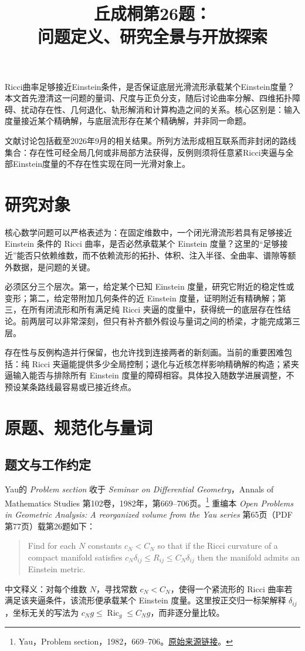 \documentclass[11pt,a4paper]{article}
\title{丘成桐第26题：\\问题定义、研究全景与开放探索}
\author{}\date{}
\theoremstyle{definition}
\newcommand{\Ric}{\operatorname{Ric}}
\newcommand{\src}[3]{\footnote{\raggedright #1，#2。\href{#3}{原始来源链接}。}}
\begin{document}
\maketitle
\vspace{-2em}

Ricci曲率足够接近Einstein条件，是否保证底层光滑流形承载某个Einstein度量？本文首先澄清这一问题的量词、尺度与正负分支，随后讨论曲率分解、四维拓扑障碍、扰动存在性、几何退化、轨形解消和计算构造之间的关系。核心区别是：输入度量接近某个精确解，与底层流形存在某个精确解，并非同一命题。

文献讨论包括截至2026年9月的相关结果。所列方法形成相互联系而非封闭的路线集合：存在性可经全局几何或非局部方法获得，反例则须将任意紧Ricci夹逼与全部Einstein度量的不存在性实现在同一光滑对象上。

\tableofcontents
\newpage

\section{研究对象}

核心数学问题可以严格表述为：在固定维数中，一个闭光滑流形若具有足够接近 Einstein 条件的 Ricci 曲率，是否必然承载某个 Einstein 度量？这里的“足够接近”能否只依赖维数，而不依赖流形的拓扑、体积、注入半径、全曲率、谱隙等额外数据，是问题的关键。

必须区分三个层次。第一，给定某个已知 Einstein 度量，研究它附近的稳定性或变形；第二，给定带附加几何条件的近 Einstein 度量，证明附近有精确解；第三，在所有闭流形和所有满足纯 Ricci 夹逼的度量中，获得统一的底层存在性结论。前两层可以非常深刻，但只有补齐额外假设与量词之间的桥梁，才能完成第三层。

存在性与反例构造并行保留，也允许找到连接两者的新刻画。当前的重要困难包括：纯 Ricci 夹逼能提供多少全局控制；退化与近核怎样影响精确解的构造；紧夹逼输入能否与排除所有 Einstein 度量的障碍相容。具体投入随数学进展调整，不预设某条路线最容易或已接近终点。

\section{原题、规范化与量词}\label{sec:definition}

\subsection{题文与工作约定}

Yau的 \emph{Problem section} 收于 \emph{Seminar on Differential Geometry}，Annals of Mathematics Studies 第102卷，1982年，第669--706页。\src{Yau}{Problem section，1982，669--706}{https://doi.org/10.1515/9781400881918-035}
重编本 \emph{Open Problems in Geometric Analysis: A reorganized volume from the Yau series} 第65页（PDF第77页）载第26题如下：
\begin{quote}
Find for each $N$ constants $c_N<C_N$ so that if the Ricci curvature of a compact manifold satisfies $c_N\delta_{ij}\le R_{ij}\le C_N\delta_{ij}$ then the manifold admits an Einstein metric.
\end{quote}
中文释义：对每个维数 $N$，寻找常数 $c_N<C_N$，使得一个紧流形的 Ricci 曲率若满足该夹逼条件，该流形便承载某个 Einstein 度量。这里按正交归一标架解释 $\delta_{ij}$，坐标无关的写法为 $c_Ng\le\Ric_g\le C_Ng$，而非逐分量比较。
\end{document}
